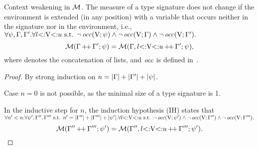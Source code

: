 \begin{lemma}{Context weakening in $\operatorname{\mathcal{M}}$.}%
\label{lem:msr-weakening}
    The measure of a type signature does not change if the environment
    is extended (in any position) with a variable that occurs neither
    in the signature nor in the environment, i.e.,
    $\forall \psi, \Gamma, \Gamma'. 
    \forall l{\operatorname{<:}}\mathrm{V}{\operatorname{<:}}u \text{ s.t. } 
    \lnot \operatorname{\mathit{occ}}(\mathrm{V};\psi) \land 
    \lnot \operatorname{\mathit{occ}}(\mathrm{V};\Gamma) \land \lnot \operatorname{\mathit{occ}}(\mathrm{V};\Gamma').$
    \[\operatorname{\mathcal{M}}(\Gamma\operatorname{+\!+}\Gamma';\psi) = 
        \operatorname{\mathcal{M}}(\Gamma,l{\operatorname{<:}}\mathrm{V}{\operatorname{<:}}u\operatorname{+\!+}\Gamma';\psi),\]
    where  denotes the concatenation of lists,
    and $\operatorname{\mathit{occ}}$ is defined in~.
\end{lemma}
\begin{proof}
    By strong induction on $n = |\Gamma| + |\Gamma'| + |\psi|$.

    Case $n = 0$ is not possible, as the minimal size of a type signature is 1.
    
    In the inductive step for $n$, the induction hypothesis (IH) states that
    $\forall n'<n. \forall \psi', \Gamma'', \Gamma'''  \text{ s.t. }
    n' = |\Gamma''| + |\Gamma'''| + |\psi'|.
    \forall l{\operatorname{<:}}\mathrm{V}{\operatorname{<:}}u \text{ s.t. } 
    \lnot \operatorname{\mathit{occ}}(\mathrm{V};\psi') \land 
    \lnot \operatorname{\mathit{occ}}(\mathrm{V};\Gamma'') \land \lnot \operatorname{\mathit{occ}}(\mathrm{V};\Gamma''').$
    \[\operatorname{\mathcal{M}}(\Gamma''\operatorname{+\!+}\Gamma''';\psi') = 
    \operatorname{\mathcal{M}}(\Gamma'',l{\operatorname{<:}}\mathrm{V}{\operatorname{<:}}u\operatorname{+\!+}\Gamma''';\psi').\]
    

\end{proof}
